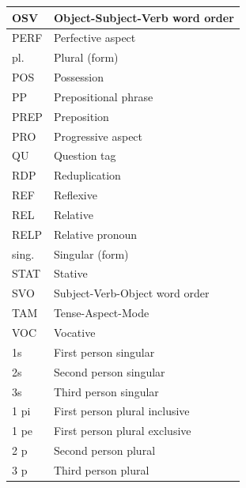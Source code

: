 \documentclass[10pt]{article}
\begin{document}
\begin{center}
\begin{tabular}{|l|l|}
\hline
OSV & Object-Subject-Verb word order \\
\hline
PERF & Perfective aspect \\
\hline
pl. & Plural (form) \\
\hline
POS & Possession \\
\hline
PP & Prepositional phrase \\
\hline
PREP & Preposition \\
\hline
PRO & Progressive aspect \\
\hline
QU & Question tag \\
\hline
RDP & Reduplication \\
\hline
REF & Reflexive \\
\hline
REL & Relative \\
\hline
RELP & Relative pronoun \\
\hline
sing. & Singular (form) \\
\hline
STAT & Stative \\
\hline
SVO & Subject-Verb-Object word order \\
\hline
TAM & Tense-Aspect-Mode \\
\hline
VOC & Vocative \\
\hline
1s & First person singular \\
\hline
2s & Second person singular \\
\hline
3s & Third person singular \\
\hline
1 pi & First person plural inclusive \\
\hline
1 pe & First person plural exclusive \\
\hline
2 p & Second person plural \\
\hline
3 p & Third person plural \\
\hline
\end{tabular}
\end{center}
\end{document}
